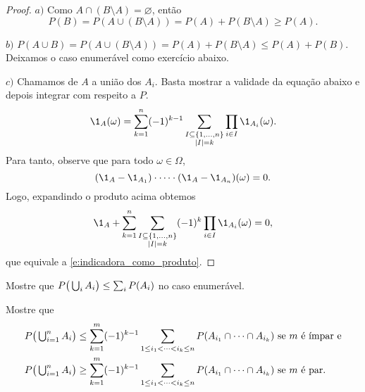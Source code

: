 \begin{proof}
  $a)$ Como $A \cap (B \setminus A) = \varnothing$, então
    \begin{equation}
        P(B) = P(A \cup (B \setminus A)) = P(A) + P(B \setminus A) \geq P(A).
  \end{equation}

  $b)$ $P(A \cup B) = P (A \cup (B \setminus A)) = P(A) + P(B \setminus
    A) \leq P(A) + P(B)$.\\
    Deixamos o caso enumerável como exercício abaixo.

  $c)$ Chamamos de $A$ a união dos $A_i$.
Basta mostrar a validade da equação abaixo e depois integrar com
    respeito a $P$.
    \begin{equation}
      \label{e:indicadora_como_produto}
      \1_A(\omega) = \sum_{k=1}^n (-1)^{k - 1} \sum_{\substack{I \subseteq \{1, \dots, n\}\\|I| = k}} \prod_{i \in I} \1_{A_i}(\omega).
    \end{equation}
    Para tanto, observe que para todo $\omega \in \Omega$,
    \begin{equation}
      (\1_A - \1_{A_1}) \cdot \dots \cdot (\1_A - \1_{A_n})(\omega) = 0.
    \end{equation}
    Logo, expandindo o produto acima obtemos
    \begin{equation}
      \1_A + \sum_{k = 1}^n \sum_{\substack{I \subseteq \{1, \dots, n\}\\|I| = k}} (-1)^k \prod_{i \in I} \1_{A_i}(\omega) = 0,
    \end{equation}
    que equivale a \eqref{e:indicadora_como_produto}.
\end{proof}

\begin{exercise}
  Mostre que $P\big(\operatorname*{{\textstyle \bigcup}}\nolimits_i A_i\big) \leq \sum_i P(A_i)$ no caso enumerável.
\end{exercise}

\begin{exercise}
  Mostre que
  \begin{equation*}
    \begin{split}
      P\big( \operatorname*{{\textstyle \bigcup}}\nolimits_{i=1}^n A_i \big) & \leq \sum\limits_{k = 1}^m (-1)^{k-1} \sum\limits_{1 \leq i_1 < \dots < i_k \leq n} P(A_{i_1} \cap \dots \cap A_{i_k}) \text{ se $m$ é ímpar e}\\
      P\big( \operatorname*{{\textstyle \bigcup}}\nolimits_{i=1}^n A_i \big) & \geq \sum\limits_{k = 1}^m (-1)^{k-1} \sum\limits_{1 \leq i_1 < \dots < i_k \leq n} P(A_{i_1} \cap \dots \cap A_{i_k}) \text{ se $m$ é par.}
    \end{split}
  \end{equation*}
\end{exercise}



